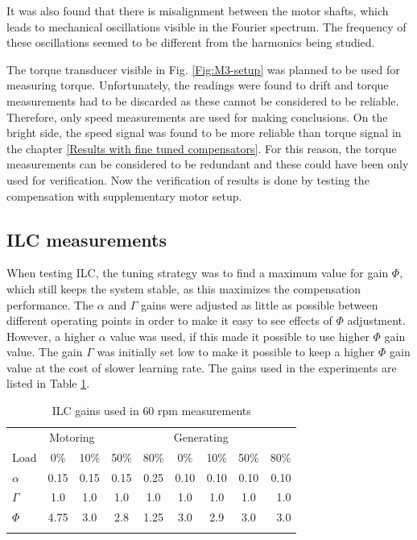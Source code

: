 It was also found that there is misalignment between the motor shafts, which leads to mechanical oscillations visible in the Fourier spectrum. The frequency of these oscillations seemed to be different from the harmonics being studied.

The torque transducer visible in Fig. \ref{Fig:M3-setup} was planned to be used for measuring torque. Unfortunately, the readings were found to drift and torque measurements had to be discarded as these cannot be considered to be reliable. Therefore, only speed measurements are used for making conclusions. On the bright side, the speed signal was found to be more reliable than torque signal in the chapter \ref{Results with fine tuned compensators}. For this reason, the torque measurements can be considered to be redundant and these could have been only used for verification. Now the verification of results is done by testing the compensation with supplementary motor setup.


\subsection{ILC measurements}
When testing ILC, the tuning strategy was to find a maximum value for gain $\Phi$, which still keeps the system stable, as this maximizes the compensation performance. The $\alpha$ and $\Gamma$ gains were adjusted as little as possible between different operating points in order to make it easy to see effects of $\Phi$ adjustment. However, a higher $\alpha$ value was used, if this made it possible to use higher $\Phi$ gain value. The gain $\Gamma$ was initially set low to make it possible to keep a higher $\Phi$ gain value at the cost of slower learning rate. The gains used in the experiments are listed in Table \ref{tab:60rpm}.
\begin{table}[htb]
\caption{ILC gains used in $60$ rpm measurements}
\centering
\begin{tabular}{lcccccccr}
\toprule
\multicolumn{4}{c}{Motoring} & \multicolumn{4}{c}{Generating}\\
\cmidrule(r){2-5} \cmidrule(r){6-9}
Load         & 0\% & 10\% & 50\% & 80\%   & 0\%    & 10\% & 50\% & 80\% \\
\midrule
$\alpha$     & 0.15 & 0.15 & 0.15 & 0.25   & 0.10  & 0.10 & 0.10 & 0.10 \\
$\Gamma$     & 1.0  & 1.0  & 1.0  & 1.0    & 1.0   & 1.0  & 1.0  & 1.0 \\
$\Phi$       & 4.75 & 3.0  & 2.8  & 1.25   & 3.0   & 2.9  & 3.0  & 3.0 \\
\bottomrule
\label{tab:60rpm}
\end{tabular}
\end{table}

